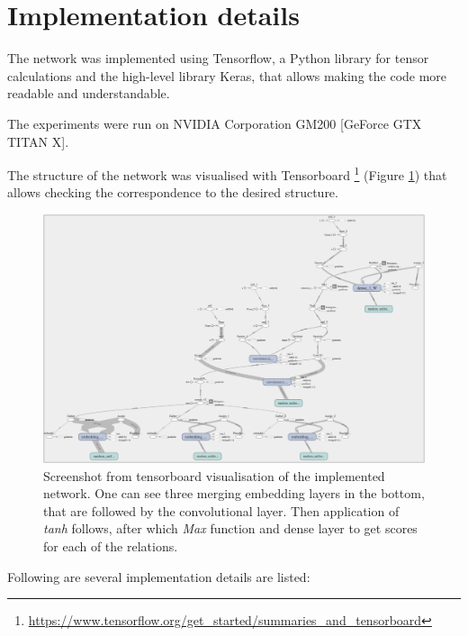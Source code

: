 \section{Implementation details}
The network was implemented using Tensorflow, a Python library for tensor calculations and the 
high-level library Keras, that allows making the code more readable and understandable.

The experiments were run on NVIDIA Corporation GM200 [GeForce GTX TITAN X].

The structure of the network was visualised with Tensorboard \footnote{\url{https://www.tensorflow.org/get_started/summaries_and_tensorboard}} (Figure \ref{fig:tensorboard_vis}) that allows checking the correspondence to the desired structure. 

	\begin{figure}
		\centering
		\includegraphics[width=\linewidth]{chapter3_approach/images/tensorboard_vis.png}
		\caption[Tensorboard visualisation of the network]{Screenshot from tensorboard visualisation of the implemented network. One can see three merging embedding layers in the bottom, that are followed by the convolutional layer. Then application of \textit{tanh} follows, after which \textit{Max} function and dense layer to get scores for each of the relations.}
		\label{fig:tensorboard_vis}
	\end{figure}

Following are several implementation details are listed:

